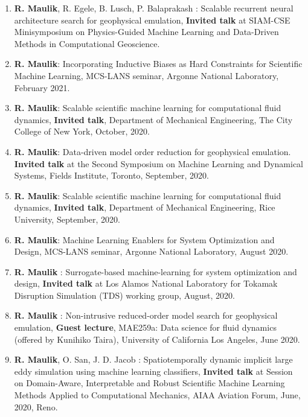 \documentclass[letterpaper]{article}
\begin{document}
\begin{enumerate}

\item \textbf{R. Maulik}, R. Egele, B. Lusch, P. Balaprakash : Scalable recurrent neural architecture search for geophysical emulation, \textbf{Invited talk} at SIAM-CSE Minisymposium on Physics-Guided Machine Learning and Data-Driven Methods in Computational Geoscience.

\item \textbf{R. Maulik}: Incorporating Inductive Biases as Hard Constraints for Scientific Machine Learning, MCS-LANS seminar, Argonne National Laboratory, February 2021.

\item \textbf{R. Maulik}: Scalable scientific machine learning for computational fluid dynamics, \textbf{Invited talk}, Department of Mechanical Engineering, The City College of New York, October, 2020.

\item \textbf{R. Maulik}: Data-driven model order reduction for geophysical emulation. \textbf{Invited talk} at the Second Symposium on Machine Learning and Dynamical Systems, Fields Institute, Toronto, September, 2020.

\item \textbf{R. Maulik}: Scalable scientific machine learning for computational fluid dynamics, \textbf{Invited talk}, Department of Mechanical Engineering, Rice University, September, 2020.

\item \textbf{R. Maulik}: Machine Learning Enablers for System Optimization and Design, MCS-LANS seminar, Argonne National Laboratory, August 2020.

\item \textbf{R. Maulik} : Surrogate-based machine-learning for system optimization and design, \textbf{Invited talk} at Los Alamos National Laboratory for Tokamak Disruption Simulation (TDS) working group, August, 2020.

\item \textbf{R. Maulik} : Non-intrusive reduced-order model search for geophysical emulation, \textbf{Guest lecture}, MAE259a: Data science for fluid dynamics (offered by Kunihiko Taira), University of California Los Angeles, June 2020.

\item \textbf{R. Maulik}, O. San, J. D. Jacob : Spatiotemporally dynamic implicit large eddy simulation using machine learning classifiers, \textbf{Invited talk} at Session on Domain-Aware, Interpretable and Robust Scientific Machine Learning Methods Applied to Computational Mechanics, AIAA Aviation Forum, June, 2020, Reno. 


\end{enumerate}
\end{document}
